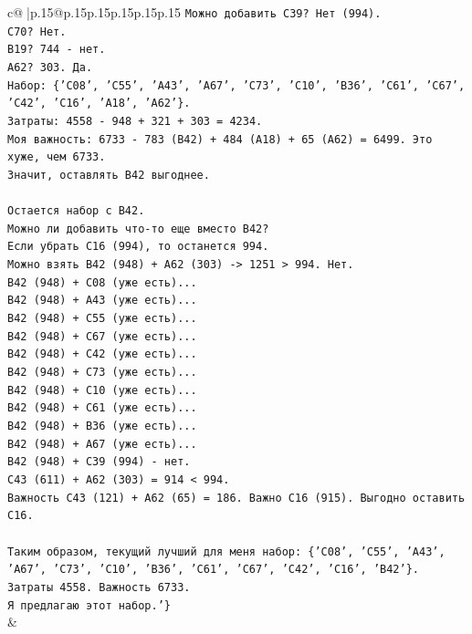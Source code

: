 \documentclass{article}
\begin{document}
{\begin{supertabular}{c@{$\;$}|p{.15\linewidth}@{}p{.15\linewidth}p{.15\linewidth}p{.15\linewidth}p{.15\linewidth}p{.15\linewidth}}
{{{\texttt{Можно добавить C39? Нет (994).} \\
\texttt{C70? Нет.} \\
\texttt{B19? 744 {-} нет.} \\
\texttt{A62? 303. Да.} \\
\texttt{Набор: \{'C08', 'C55', 'A43', 'A67', 'C73', 'C10', 'B36', 'C61', 'C67', 'C42', 'C16', 'A18', 'A62'\}.} \\
\texttt{Затраты: 4558 {-} 948 + 321 + 303 = 4234.} \\
\texttt{Моя важность: 6733 {-} 783 (B42) + 484 (A18) + 65 (A62) = 6499. Это хуже, чем 6733.} \\
\texttt{Значит, оставлять B42 выгоднее.} \\
\\ 
\texttt{Остается набор с B42.} \\
\texttt{Можно ли добавить что{-}то еще вместо B42?} \\
\texttt{Если убрать C16 (994), то останется 994.} \\
\texttt{Можно взять B42 (948) + A62 (303) {-}> 1251 > 994. Нет.} \\
\texttt{B42 (948) + C08 (уже есть)...} \\
\texttt{B42 (948) + A43 (уже есть)...} \\
\texttt{B42 (948) + C55 (уже есть)...} \\
\texttt{B42 (948) + C67 (уже есть)...} \\
\texttt{B42 (948) + C42 (уже есть)...} \\
\texttt{B42 (948) + C73 (уже есть)...} \\
\texttt{B42 (948) + C10 (уже есть)...} \\
\texttt{B42 (948) + C61 (уже есть)...} \\
\texttt{B42 (948) + B36 (уже есть)...} \\
\texttt{B42 (948) + A67 (уже есть)...} \\
\texttt{B42 (948) + C39 (994) {-} нет.} \\
\texttt{C43 (611) + A62 (303) = 914 < 994.} \\
\texttt{Важность C43 (121) + A62 (65) = 186. Важно C16 (915). Выгодно оставить C16.} \\
\\ 
\texttt{Таким образом, текущий лучший для меня набор: \{'C08', 'C55', 'A43', 'A67', 'C73', 'C10', 'B36', 'C61', 'C67', 'C42', 'C16', 'B42'\}.} \\
\texttt{Затраты 4558. Важность 6733.} \\
\texttt{Я предлагаю этот набор.'\}} \\
            }
        }
    }
    & \\ \\


\end{supertabular}}
\end{document}

